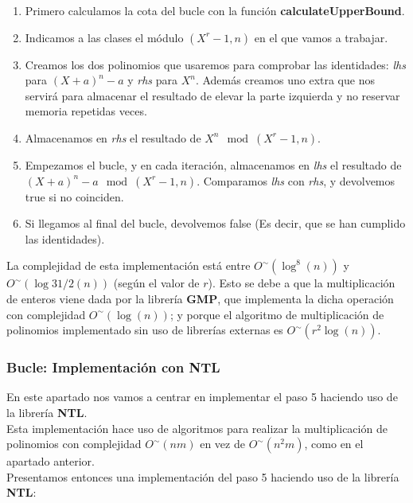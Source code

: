 \begin{enumerate}
	\item Primero calculamos la cota del bucle con la función \textbf{calculateUpperBound}.
	
	\item Indicamos a las clases el módulo $(X^r - 1, n)$ en el que vamos a trabajar.
	
	\item Creamos los dos polinomios que usaremos para comprobar las identidades: \textit{lhs} para $(X + a)^n - a$ y \textit{rhs} para $X^n$. Además creamos uno extra que nos servirá para almacenar el resultado de elevar la parte izquierda y no reservar memoria repetidas veces.
	
	\item Almacenamos en \textit{rhs} el resultado de $X^n \mod(X^r - 1, n)$.
	
	\item Empezamos el bucle, y en cada iteración, almacenamos en \textit{lhs} el resultado de $(X + a)^n - a \mod(X^r - 1, n)$. Comparamos \textit{lhs} con \textit{rhs}, y devolvemos true si no coinciden.
	
	\item Si llegamos al final del bucle, devolvemos false (Es decir, que se han cumplido las identidades).
\end{enumerate}

La complejidad de esta implementación está entre $O^\sim(\log^8(n))$ y $O^\sim(\log{31/2}(n))$ (según el valor de $r$). Esto se debe a que la multiplicación de enteros viene dada por la librería \textbf{GMP}, que implementa la dicha operación con complejidad $O^\sim(\log(n))$; y porque el algoritmo de multiplicación de polinomios implementado sin uso de librerías externas es $O^\sim(r^2\log(n))$.

\subsubsection{Bucle: Implementación con NTL}

En este apartado nos vamos a centrar en implementar el paso 5 haciendo uso de la librería \textbf{NTL}.\\

Esta implementación hace uso de algoritmos para realizar la multiplicación de polinomios con complejidad $O^\sim(nm)$ en vez de $O^\sim(n^2m)$, como en el apartado anterior.\\

Presentamos entonces una implementación del paso 5 haciendo uso de la librería \textbf{NTL}:\\

